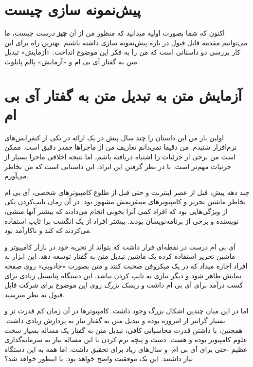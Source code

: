 \section{پیش‌نمونه سازی
چیست}\label{ux67eux6ccux634ux646ux645ux648ux646ux647-ux633ux627ux632ux6cc-ux686ux6ccux633ux62a}

اکنون که شما بصورت اولیه میدانید که منظور من از آن \textbf{چیز}
\emph{درست} چیست، ما می‌توانیم مقدمه قابل قبول در باره پیش‌نمونه سازی
داشته باشیم. بهترین راه برای این کار بررسی دو داستانی است که من را به
فکر این موضوع انداخت: «آزمایش» تبدیل متن به گفتار آی بی ام و «آزمایش»
پالم پایلوت.

\section{آزمایش متن به تبدیل متن به گفتار آی بی
ام}\label{ux622ux632ux645ux627ux6ccux634-ux645ux62aux646-ux628ux647-ux62aux628ux62fux6ccux644-ux645ux62aux646-ux628ux647-ux6afux641ux62aux627ux631-ux622ux6cc-ux628ux6cc-ux627ux645}

اولین بار من این داستان را چند سال پیش در یک ارائه در یکی از کنفرانس‌های
نرم‌افزار شنیدم. من دقیقا نمی‌دانم تعاریف من از ماجراها چقدر دقیق است.
ممکن است من برخی از جزئیات را اشتباه دریافته باشم، اما نتیجه اخلاقی
ماجرا بسیار از جزئیات مهم‌تر است. با در نظر گرفتن این ایراد، این داستانی
است که من بخاطر می‌آورم.

چند دهه پیش، قبل از عصر اینترنت و حتی قبل از طلوع کامپیوترهای شخصی، آی
بی ام بخاطر ماشین تحریر و کامپیوترهای مینفریمش مشهور بود. در آن زمان
تایپ‌کردن یکی از ویژگی‌هایی بود که افراد کمی آنرا بخوبی انجام می‌دادند
که بیشتر آنها منشی، نویسنده و برخی از برنامه‌نویسان بودند. بیشتر افراد
از یک انگشت برا تایپ استفاده می‌کردند که کند و ناکارآمد بود.

آی بی ام درست در نقطه‌ای قرار داشت که بتواند از تجربه خود در بازار
کامپیوتر و ماشین تحریر استفاده کرده یک ماشین تبدیل متن به گفتار توسعه
دهد. این ابزار به افراد اجازه میداد که در یک میکروفن صحبت کنند و متن
بصورت «جادویی» روی صفحه نمایش ظاهر شود و دیگر نیازی به تایپ کردن نباشد.
این دستگاه پتانسیل زیادی برای کسب درآمد برای آی بی ام داشت و \emph{ریسک
بزرگ} روی این موضوع برای شرکت قابل قبول به نظر میرسید.

اما در این میان چندین اشکال بزرگ وجود داشت. کامپیوترها در آن زمان کم
قدرت تر و بسیار گرانتر از امروزه بوده و تبدیل متن به گفتار نیاز به
پردازش زیادی داشت. همچنین، با داشتن قدرت محاسباتی کافی، تبدیل متن به
گفتار یک مساله بسیار سخت علوم کامپیوتر بوده و هست. دست و پنچه نرم کردن
با این مساله نیاز به سرمایه‌گذاری عظیم -حتی برای آی بی ام- و سال‌های
زیاد برای تحقیق داشت. اما همه به این دستگاه نیاز داشتند. این یک موفقیت
واضح خواهد بود. یا اینطور خواهد شد؟

